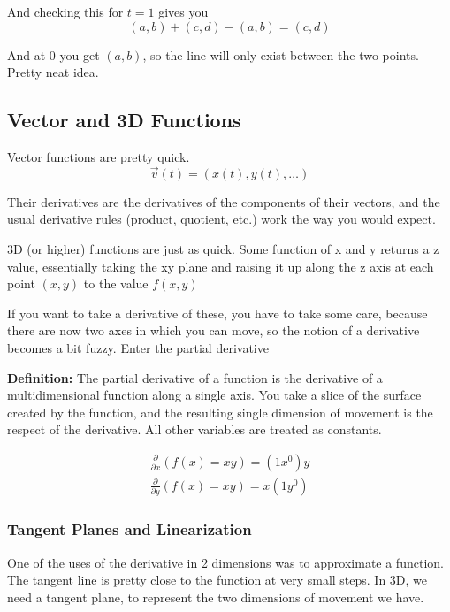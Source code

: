\documentclass[12pt, letterpaper]{article}
\begin{document}
And checking this for $t = 1$ gives you 
\begin{displaymath}
    (a, b) + (c, d) - (a, b) = (c, d)
\end{displaymath}

And at 0 you get $(a, b)$, so the line will only exist between the two points. Pretty neat idea.

\subsection{Vector and 3D Functions}

Vector functions are pretty quick.
\begin{displaymath}
    \vec{v}(t) = (x(t), y(t), \dots)
\end{displaymath}

Their derivatives are the derivatives of the components of their vectors, and the usual derivative rules (product, quotient, etc.) work the way you would expect.

3D (or higher) functions are just as quick. Some function of x and y returns a z value, essentially taking the xy plane and raising it up along the z axis at each point $(x, y)$ to the value $f(x, y)$

If you want to take a derivative of these, you have to take some care, because there are now two axes in which you can move, so the notion of a derivative becomes a bit fuzzy. Enter the partial derivative

\textbf{Definition:} The partial derivative of a function is the derivative of a multidimensional function along a single axis. You take a slice of the surface created by the function, and the resulting single dimension of movement is the respect of the derivative. All other variables are treated as constants.

\begin{gather*}
    \frac{\partial}{\partial x}(f(x) = xy) = (1x^0)y \\
    \frac{\partial}{\partial y}(f(x) = xy) = x(1y^0)
\end{gather*}

\subsubsection{Tangent Planes and Linearization}
One of the uses of the derivative in 2 dimensions was to approximate a function. The tangent line is pretty close to the function at very small steps. In 3D, we need a tangent plane, to represent the two dimensions of movement we have.
\end{document}
